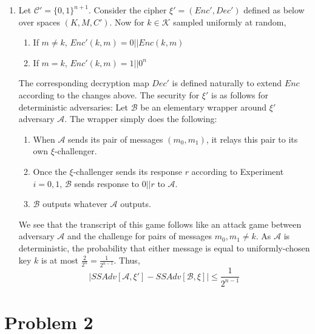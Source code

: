 \documentclass[11pt]{article}
\begin{document}
\begin{enumerate}
  \item Let $\mathcal{C}' = \{0,1\}^{n+1}$. Consider the cipher $\xi' = (Enc', Dec')$ defined as below over spaces $(K, M, C')$. Now for $k \in \mathcal{K}$ sampled uniformly at random,
  \begin{enumerate}
    \item If $m \neq k$, $Enc'(k, m) = 0 || Enc(k, m)$
    \item If $m = k$, $Enc'(k, m) = 1 || 0^n$
  \end{enumerate}
  The corresponding decryption map $Dec'$ is defined naturally to extend $Enc$ according to the changes above. The security for $\xi'$ is as follows for deterministic adversaries:
  Let $\mathcal{B}$ be an elementary wrapper around $\xi'$ adversary $\mathcal{A}$. The wrapper simply does the following:
  \begin{enumerate}
    \item When $\mathcal{A}$ sends its pair of messages $(m_0, m_1)$, it relays this pair to its own $\xi$-challenger.
    \item Once the $\xi$-challenger sends its response $r$ according to Experiment $i = 0,1$, $\mathcal{B}$ sends response to $0||r$ to $\mathcal{A}$.
    \item $\mathcal{B}$ outputs whatever $\mathcal{A}$ outputs.
  \end{enumerate}
  We see that the transcript of this game follows like an attack game between adversary $\mathcal{A}$ and the challenge for pairs of messages $m_0, m_1 \neq k$. As $\mathcal{A}$ is deterministic, the probability that either message is equal to uniformly-chosen key $k$ is at most $\frac{2}{2^n} = \frac{1}{2^{n-1}}$. Thus,
  $$ |SSAdv[\mathcal{A}, \xi'] - SSAdv[\mathcal{B}, \xi]| \leq \frac{1}{2^{n-1}}$$
\end{enumerate}

\section*{Problem 2}
\end{document}
